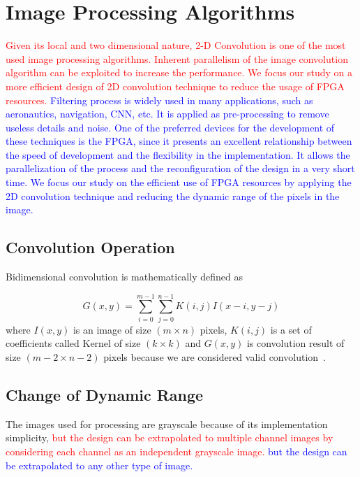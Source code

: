 \documentclass[conference,compsoc]{IEEEtran}
\begin{document}
\section{Image Processing Algorithms}\label{sec:preproc}
\textcolor{red}{ Given its local and two dimensional nature, 2-D Convolution is one of the most used image processing algorithms. 
Inherent parallelism of the image convolution algorithm can be exploited to increase the performance.
We focus our study on a more efficient design of 2D convolution technique
to reduce the usage of  FPGA resources. } 
\textcolor{blue}{Filtering process is widely used in many applications, such as aeronautics, navigation,
CNN, etc. It is applied as pre-processing to remove useless details and
noise. One of the preferred devices for the development of these techniques is
the FPGA, since it presents an excellent relationship between the speed of
development and the flexibility in the implementation. It allows the
parallelization of the process and the reconfiguration of the design in a very
short time. We focus our study on the efficient use of FPGA resources by applying the
2D convolution technique and reducing the dynamic range of the pixels in the
image. } 

\subsection{Convolution Operation}

Bidimensional convolution is mathematically defined as

\begin{equation}\label{conv-org}
  G(x,y) = \sum_{i=0}^{m-1} \sum_{j=0}^{n-1}K(i,j)I(x-i,y-j)
\end{equation}
where $I(x,y)$ is an image of size $(m \times n)$ pixels, $K(i,j)$ is a set of
coefficients called Kernel of size $(k \times k)$ and $G(x,y)$ is convolution
result of size $(m-2 \times n-2)$ pixels because we are considered valid
convolution~\cite{validconv}. 

\subsection{Change of Dynamic Range}

The images used for processing are grayscale because of its implementation simplicity, \textcolor{red}{but the design can be extrapolated
to multiple channel images by considering each channel as an independent grayscale image.}
\textcolor{blue}{but the design can be extrapolated to any other type of image.} 
\end{document}

